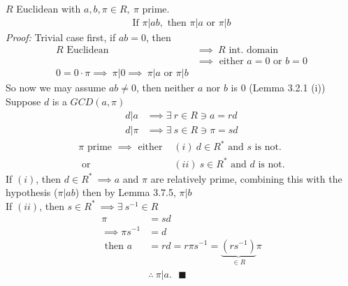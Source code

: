 \begin{lemma}
    $R$ Euclidean with $a,b, \pi \in R, \ \pi \text{ prime}$.
    \begin{align*}
        \text{If }\pi | ab, \text{ then }\pi|a \text{ or }\pi|b
    \end{align*}
    \textit{Proof: } Trivial case first, if $ab=0$, then 
    \begin{align*}
        R \text{ Euclidean }&\implies \ R \text{ int. domain} \\
        &\implies \text{ either }a=0 \text{ or }b=0 \\
        0=0\cdot \pi \implies \ \pi | 0 \implies \ \pi | a \text{ or } \pi | b
    \end{align*}
    So now we may assume $ab\neq 0$, then neither $a$ nor $b$ is $0$ (Lemma 3.2.1 (i))\\
    Suppose $d$ is a $GCD(a,\pi)$
    \begin{align*}
        d|a &\implies \exists \ r\in R \ni a =rd \\
        d|\pi &\implies \exists \ s\in R \ni \pi = sd 
    \end{align*}
    \begin{align*}
        \pi \text{ prime }\implies \text{ either } &(i) \ d\in R^* \text{ and }s \text{ is not.} \\
        \text{ or }&(ii) \ s\in R^* \text{ and }d \text{ is not.} 
    \end{align*}
    If $(i)$, then $d\in R^* \ \implies a$ and $\pi$ are relatively prime, combining this with the hypothesis ($\pi|ab$) then by Lemma 3.7.5, $\pi|b$ \\

    \noindent If $(ii)$, then $s\in R^* \ \implies \exists \ s^{-1}\in R $
    \begin{align*}
        \pi &= sd \\
        \implies \pi s^{-1} &= d \\
        \text{ then }a&= rd =r\pi s^{-1}= \underbrace{(rs^{-1})}_{\in R}\pi \\
        &\therefore \ \pi | a. \ \ \ \blacksquare
    \end{align*}
\end{lemma}
\setcounter{dummy_lemma}{5}
